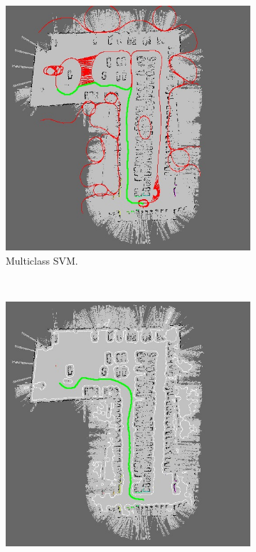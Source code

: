 \begin{figure}[h!]
  \centering
  \begin{subfigure}[b]{0.45\textwidth}
	  \centering
	  \includegraphics[width=\textwidth, trim=0 0 0 0,clip]{figure14}
	  \caption{Multiclass \ac{SVM}.}
	  \label{fig:cp06_multi_svm_final}
  \end{subfigure}%
  ~
  \begin{subfigure}[b]{0.45\textwidth}
	  \centering
	  \includegraphics[width=\textwidth, trim=0 0 0 0,clip]{figure15}

\end{subfigure}
\end{figure}
